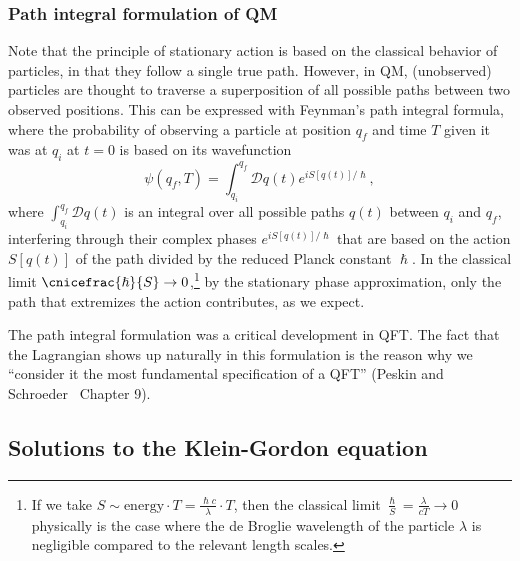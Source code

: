 \subsubsection{Path integral formulation of QM}
\label{sec:01_qft_classical_path_integral}

Note that the principle of stationary action is based on the classical behavior of particles, in that they follow a single true path.
However, in QM, (unobserved) particles are thought to traverse a superposition of all possible paths between two observed positions.
This can be expressed with Feynman's path integral formula, where the probability of observing a particle at position $q_f$ and time $T$ given it was at $q_i$ at $t = 0$ is based on its wavefunction
\begin{equation}
	\label{eq:01_qft_lagrangian_path_integral}
	\psi(q_f, T) = \int_{q_i}^{q_f} \mathcal{D}q(t) e^{iS[q(t)]/\hslash},
\end{equation}
where $\int_{q_i}^{q_f}\mathcal{D}q(t)$ is an integral over all possible paths $q(t)$ between $q_i$ and $q_f$, interfering through their complex phases $e^{iS[q(t)]/\hslash}$ that are based on the action $S[q(t)]$ of the path divided by the reduced Planck constant $\hslash$.
In the classical limit $\cnicefrac{\hslash}{S} \rightarrow 0$,\footnote{If we take $S \sim \mathrm{energy} \cdot T = \frac{\hslash c}{\lambda}\cdot T$, then the classical limit $\frac{\hslash}{S} = \frac{\lambda}{cT} \rightarrow 0$ physically is the case where the de Broglie wavelength of the particle $\lambda$ is negligible compared to the relevant length scales.} by the stationary phase approximation, only the path that extremizes the action contributes, as we expect.

The path integral formulation was a critical development in QFT.
The fact that the Lagrangian shows up naturally in this formulation is the reason why we ``consider it the most fundamental specification of a QFT'' (Peskin and Schroeder~\cite{Peskin:1995ev} Chapter 9).


\subsection{Solutions to the Klein-Gordon equation}

